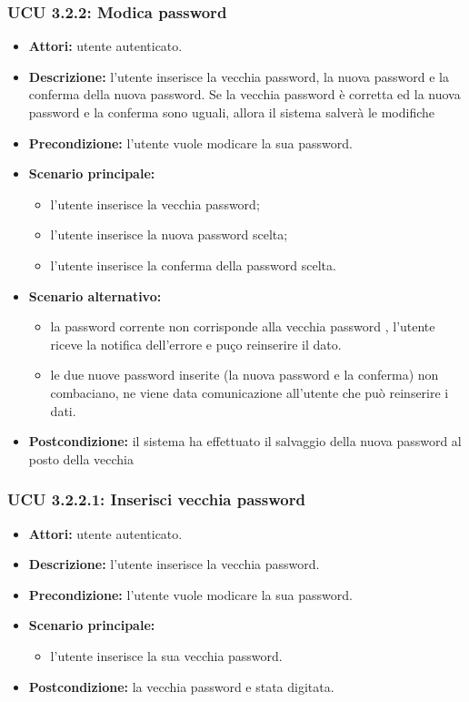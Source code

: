 \subsubsection{UCU 3.2.2: Modica password}
\begin{itemize}
	\item \textbf{Attori: }  utente autenticato.
	\item \textbf{Descrizione: } l'utente inserisce la vecchia password, la nuova password e la conferma della nuova password. Se la vecchia password è corretta ed la nuova password e la conferma sono uguali, allora il sistema salverà le modifiche 
	\item \textbf{Precondizione: } l'utente vuole modicare la sua password.
	\item \textbf{Scenario principale:}
	\begin{itemize}
		\item l'utente inserisce la vecchia password;
		\item l'utente inserisce la nuova password scelta;
		\item l'utente inserisce la conferma della password scelta.
	\end{itemize}
	\item \textbf{Scenario alternativo:}
	\begin{itemize}
		\item la password corrente non corrisponde alla vecchia password , l'utente riceve la notifica dell'errore e puço reinserire il dato.
		\item le due nuove password inserite (la nuova password e la conferma) non combaciano, ne viene data comunicazione all'utente che può reinserire i dati.
	\end{itemize}
	\item \textbf{Postcondizione:} il sistema ha effettuato il salvaggio della nuova password al  posto della vecchia
\end{itemize}

\subsubsection{UCU 3.2.2.1: Inserisci vecchia password}
\begin{itemize}
	\item \textbf{Attori: } utente autenticato.
	\item \textbf{Descrizione: } l'utente inserisce la vecchia password.
	\item \textbf{Precondizione: } l'utente vuole modicare la sua password.
	\item \textbf{Scenario principale:}
	\begin{itemize}
		\item l'utente inserisce la sua vecchia password.
	\end{itemize}
	\item \textbf{Postcondizione:} la vecchia password e stata digitata.
\end{itemize}

